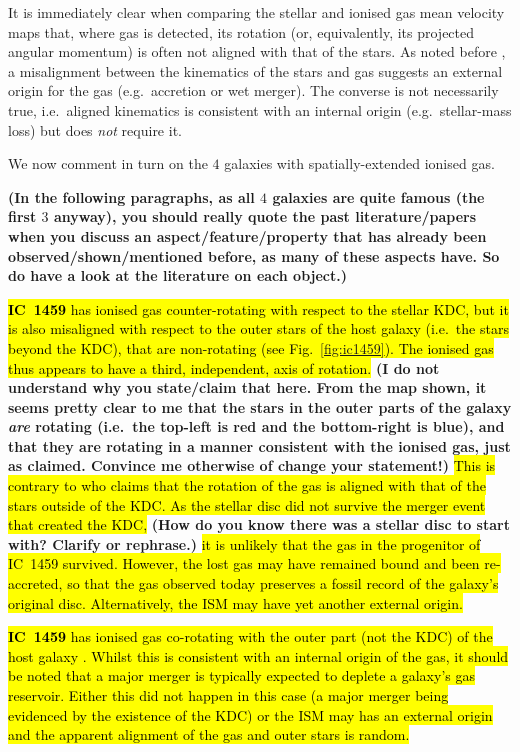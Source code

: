 \documentclass[a4paper,fleqn,usenatbib]{mnras}
\DeclareRobustCommand{\removed}[1]{{\sethlcolor{red}\hl{#1}}}
\DeclareRobustCommand{\added}[1]{{\sethlcolor{green}\hl{#1}}}
\begin{document}
It is immediately clear when comparing the stellar and ionised gas
mean velocity maps that, where gas is detected, its rotation (or,
equivalently, its projected angular momentum) is often not aligned
with that of the stars. As noted before \citep[e.g.][]{Davis2011a}, a
misalignment between the kinematics of the stars and gas suggests an
external origin for the gas (e.g.\ accretion or wet merger). The
converse is not necessarily true, i.e.\ aligned kinematics is
consistent with an internal origin (e.g.\ stellar-mass loss) but does
\emph{not} require it.

We now comment in turn on the $4$ galaxies with spatially-extended
ionised gas.

{\bf (In the following paragraphs, as all $4$ galaxies are quite
  famous (the first $3$ anyway), you should really quote the past
  literature/papers when you discuss an aspect/feature/property that
  has already been observed/shown/mentioned before, as many of these
  aspects have. So do have a look at the literature on each object.)}

\removed{\textbf{IC~1459} has ionised gas counter-rotating with respect to the
stellar KDC, but it is also misaligned with respect to the outer stars
of the host galaxy (i.e.\ the stars beyond the KDC), that are
non-rotating (see Fig.~\ref{fig:ic1459}). The ionised gas thus appears
to have a third, independent, axis of rotation.} {\bf (I do not
  understand why you state/claim that here. From the map shown, it
  seems pretty clear to me that the stars in the outer parts of the
  galaxy {\em are} rotating (i.e.\ the top-left is red and the
  bottom-right is blue), and that they are rotating in a manner
  consistent with the ionised gas, just as \citet{Franx1988}
  claimed. Convince me otherwise of change your statement!)} \removed{This is
contrary to \citet{Franx1988} who claims that the rotation of the gas
is aligned with that of the stars outside of the KDC. As the stellar
disc did not survive the merger event that created the KDC, }{\bf (How
  do you know there was a stellar disc to start with? Clarify or
  rephrase.)} \removed{it is unlikely that the gas in the progenitor of IC~1459
survived. However, the lost gas may have remained bound and been
re-accreted, so that the gas observed today preserves a fossil record
of the galaxy's original disc. Alternatively, the ISM may have yet
another external origin.}

\added{\textbf{IC~1459} has ionised gas co-rotating with the outer part (not the KDC) of the host galaxy \citep{Franx1988}. Whilst this is consistent with an internal origin of the gas, it should be noted that a major merger is typically expected to deplete a galaxy's gas reservoir. Either this did not happen in this case (a major merger being evidenced by the existence of the KDC) or the ISM may has an external origin and the apparent alignment of the gas and outer stars is random.}
\end{document}

